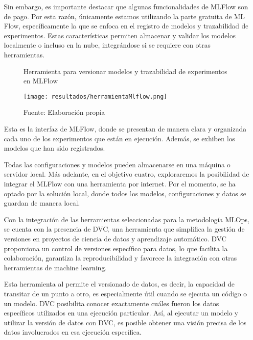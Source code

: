 Sin embargo, es importante destacar que algunas funcionalidades de MLFlow son de pago. Por esta razón, únicamente estamos utilizando la parte gratuita de ML Flow, específicamente la que se enfoca en el registro de modelos y trazabilidad de experimentos. Estas características permiten almacenar y validar los modelos localmente o incluso en la nube, integrándose si se requiere con otras herramientas.

\newpage

\begin{figure}[h]
\centering
\caption{Herramienta para versionar modelos y trazabilidad de experimentos en MLFlow}
\texttt{[image: resultados/herramientaMlflow.png]}
\caption*{\footnotesize Fuente: Elaboración propia}
\label{fig:figuraHerramientaMlflow}
\end{figure}

Esta es la interfaz de MLFlow, donde se presentan de manera clara y organizada cada uno de los experimentos que están en ejecución. Además, se exhiben los modelos que han sido registrados. \newline

Todas las configuraciones y modelos pueden almacenarse en una máquina o servidor local. Más adelante, en el objetivo cuatro, exploraremos la posibilidad de integrar el MLFlow con una herramienta por internet. Por el momento, se ha optado por la solución local, donde todos los modelos, configuraciones y datos se guardan de manera local. \newline

Con la integración de las herramientas seleccionadas para la metodología MLOps, se cuenta con la presencia de DVC, una herramienta que simplifica la gestión de versiones en proyectos de ciencia de datos y aprendizaje automático. DVC proporciona un control de versiones específico para datos, lo que facilita la colaboración, garantiza la reproducibilidad y favorece la integración con otras herramientas de machine learning.

\newpage

Esta herramienta al permite el versionado de datos, es decir, la capacidad de transitar de un punto a otro, es especialmente útil cuando se ejecuta un código o un modelo. DVC posibilita conocer exactamente cuáles fueron los datos específicos utilizados en una ejecución particular. Así, al ejecutar un modelo y utilizar la versión de datos con DVC, es posible obtener una visión precisa de los datos involucrados en esa ejecución específica.

